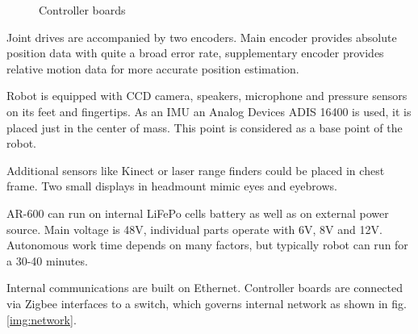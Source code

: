 \documentclass[letterpaper, 10 pt, conference]{ieeeconf}  %
\begin{document}
\begin{figure}[thpb]
\centering
{}
\caption{Controller boards}
\label{img:electronics}
\end{figure}

Joint drives are accompanied by two encoders. Main encoder provides absolute
position data with quite a broad error rate, supplementary encoder provides
relative motion data for more accurate position estimation.

Robot is equipped with CCD camera, speakers, microphone and pressure sensors
on its feet and fingertips. As an IMU an Analog Devices ADIS 16400 is used, it
is placed just in the center of mass. This point is considered as a base point of the robot. 

Additional sensors like Kinect or laser range finders could be placed in chest
frame. Two small displays in headmount mimic eyes and eyebrows.

AR-600 can run on internal LiFePo cells battery as well as on external power
source. Main voltage is 48V, individual parts operate with 6V, 8V and 12V.
Autonomous work time depends on many factors, but typically robot can run for a
30-40 minutes.

Internal communications are built on Ethernet. Controller boards are connected
via Zigbee interfaces to a switch, which governs internal network as shown
in fig. \ref{img:network}.
\end{document}

